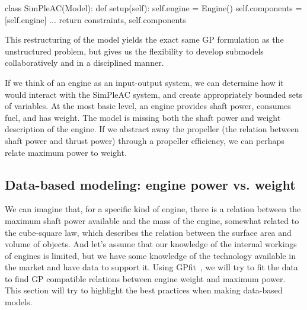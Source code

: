 \begin{python}
    class SimPleAC(Model):
        def setup(self):
            self.engine = Engine()
            self.components = [self.engine]
            ...
            return constraints, self.components
\end{python}

This restructuring of the model yields the exact same \gls{GP} formulation
as the unstructured problem, but gives us the flexibility to develop submodels
collaboratively and in a disciplined manner.

If we think of an engine as an input-output system, we can determine how it
would interact with the SimPleAC system, and create appropriately bounded
sets of variables.
At the most basic level, an engine provides shaft power, consumes fuel,
and has weight. The model is missing both the shaft power and weight description
of the engine. If we abstract away the propeller (the relation between shaft
power and thrust power) through a propeller efficiency,
we can perhaps relate maximum power to weight.

\subsection{Data-based modeling: engine power vs. weight}
\label{s:datafit}

We can imagine that, for a specific kind of engine, there is a relation between the
maximum shaft power available and the mass of the engine, somewhat related to the
cube-square law, which describes the relation between the surface area and volume
of objects. And let's assume that our knowledge of the internal workings of engines
is limited, but we have some knowledge of the technology available in the market
and have data to support it. Using GPfit~\cite{gpfitpaper}, we will try to fit the data to find
\gls{GP} compatible relations between engine weight and maximum power. This section
will try to highlight the best practices when making data-based models.

